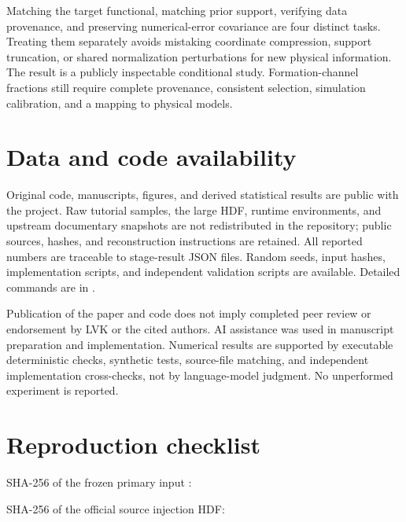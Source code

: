 \documentclass[a4paper,11pt]{article}
\begin{document}
Matching the target functional, matching prior support, verifying data provenance, and preserving numerical-error covariance are four distinct tasks. Treating them separately avoids mistaking coordinate compression, support truncation, or shared normalization perturbations for new physical information. The result is a publicly inspectable conditional study. Formation-channel fractions still require complete provenance, consistent selection, simulation calibration, and a mapping to physical models.

\FloatBarrier
\section*{Data and code availability}
Original code, manuscripts, figures, and derived statistical results are public with the project. Raw tutorial samples, the large HDF, runtime environments, and upstream documentary snapshots are not redistributed in the repository; public sources, hashes, and reconstruction instructions are retained. All reported numbers are traceable to stage-result JSON files. Random seeds, input hashes, implementation scripts, and independent validation scripts are available. Detailed commands are in .

Publication of the paper and code does not imply completed peer review or endorsement by LVK or the cited authors. AI assistance was used in manuscript preparation and implementation. Numerical results are supported by executable deterministic checks, synthetic tests, source-file matching, and independent implementation cross-checks, not by language-model judgment. No unperformed experiment is reported.

\FloatBarrier
\appendix
\section{Reproduction checklist}\label{app:reproduction}
SHA-256 of the frozen primary input :\par\nopagebreak
{}

SHA-256 of the official source injection HDF:\par\nopagebreak
{}
\end{document}
